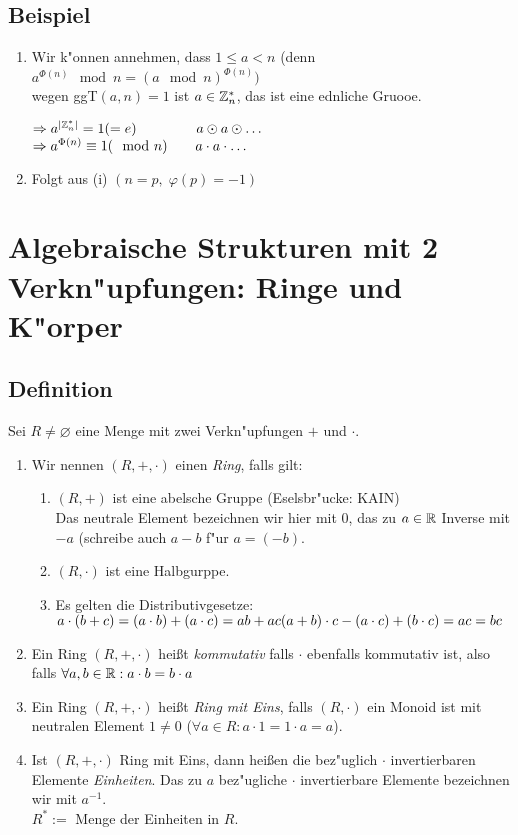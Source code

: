 
 \subsection{Beispiel}
 \begin{enumerate}
 \item
 Wir k"onnen annehmen, dass $1 \leq a < n $ (denn $a^{\Phi(n)} \mod{n}= (a \mod{n})^{\Phi(n)})$\\
 wegen ggT$(a,n)=1$ ist $a \in \mathbb{Z}^*_n$, das ist eine ednliche Gruooe.
 
 $\Rightarrow a^{|\mathbb{Z}^*_n|}=1(=e) \hspace{1.5cm} a \odot a \odot \dots$\\
 $\Rightarrow a^{\Phi(n)} \equiv 1 (\mod{n}) \hspace{0.7cm} a \cdot a \cdot \dots $ 
 \item
 Folgt aus (i) $(n=p,\; \varphi (p) = -1)$

\end{enumerate}
\section{Algebraische Strukturen mit 2 Verkn"upfungen: Ringe und K"orper}

\subsection{Definition}
Sei $R \neq \varnothing$ eine Menge mit zwei Verkn"upfungen $+$ und $\cdot$.
\begin{enumerate}
	\item
	Wir nennen $(R, +, \cdot)$ einen \emph{Ring}, falls gilt:\\
	\begin{enumerate}
		\item
		$(R,+)$ ist eine abelsche Gruppe (Eselsbr"ucke: KAIN)\\
		Das neutrale Element bezeichnen wir hier mit $0$, das zu $a \in \mathbb{R}$ Inverse mit $-a$ (schreibe auch $a-b$ f"ur $a=(-b)$.
		\item
		$(R,\cdot)$ ist eine Halbgurppe.
		\item
		Es gelten die Distributivgesetze:\\
		$a\cdot (b+c) = (a \cdot b) + (a \cdot c) = ab + ac\\
		(a+b) \cdot c - (a \cdot c) + (b \cdot c) = ac = bc$
	\end{enumerate}
	\item
	Ein Ring $(R,+, \cdot)$ heißt \emph{kommutativ} falls $\cdot$ ebenfalls kommutativ ist, also falls $\forall a,b \in \mathbb{R}: a \cdot b = b \cdot a$
	\item
	Ein Ring $(R,+, \cdot)$ heißt \emph{Ring mit Eins}, falls $(R, \cdot)$ ein Monoid ist mit neutralen Element $1\neq 0$ ($\forall a \in R: a \cdot 1 = 1 \cdot a = a$).
	\item
	Ist $(R, +, \cdot)$ Ring mit Eins, dann heißen die bez"uglich $\cdot$ invertierbaren Elemente \emph{Einheiten}. Das zu $a$ bez"ugliche $\cdot$
	invertierbare Elemente bezeichnen wir mit $a^{-1}$.\\ $R^* :=$ Menge der Einheiten in $R$.
\end{enumerate}

